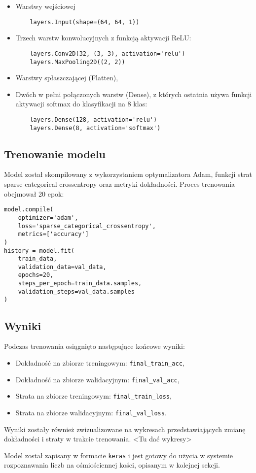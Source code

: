\begin{itemize}
    \item Warstwy wejściowej
    \begin {verbatim}
    layers.Input(shape=(64, 64, 1))
    \end {verbatim}
    \item Trzech warstw konwolucyjnych z funkcją aktywacji ReLU:
    \begin{verbatim}
    layers.Conv2D(32, (3, 3), activation='relu')
    layers.MaxPooling2D((2, 2))
    \end{verbatim}
    \item Warstwy spłaszczającej (Flatten),
    \item Dwóch w pełni połączonych warstw (Dense), z których ostatnia używa funkcji aktywacji softmax do klasyfikacji na 8 klas:
    \begin{verbatim}
    layers.Dense(128, activation='relu')
    layers.Dense(8, activation='softmax')
    \end{verbatim}
\end{itemize}

\subsection{Trenowanie modelu}\label{subsec:trenowanie-modelu}

Model został skompilowany z wykorzystaniem optymalizatora Adam, funkcji strat sparse categorical crossentropy oraz metryki dokładności.
Proces trenowania obejmował 20 epok:

\begin{verbatim}
model.compile(
    optimizer='adam',
    loss='sparse_categorical_crossentropy',
    metrics=['accuracy']
)
history = model.fit(
    train_data,
    validation_data=val_data,
    epochs=20,
    steps_per_epoch=train_data.samples,
    validation_steps=val_data.samples
)
\end{verbatim}

\subsection{Wyniki}\label{subsec:wyniki}

Podczas trenowania osiągnięto następujące końcowe wyniki:

\begin{itemize}
    \item Dokładność na zbiorze treningowym: \texttt{final\_train\_acc},
    \item Dokładność na zbiorze walidacyjnym: \texttt{final\_val\_acc},
    \item Strata na zbiorze treningowym: \texttt{final\_train\_loss},
    \item Strata na zbiorze walidacyjnym: \texttt{final\_val\_loss}.
\end{itemize}

Wyniki zostały również zwizualizowane na wykresach przedstawiających zmianę dokładności i straty w trakcie trenowania.
<Tu dać wykresy>

Model został zapisany w formacie \texttt{keras} i jest gotowy do użycia w systemie rozpoznawania liczb na ośmiościennej kości, opisanym w kolejnej sekcji.

